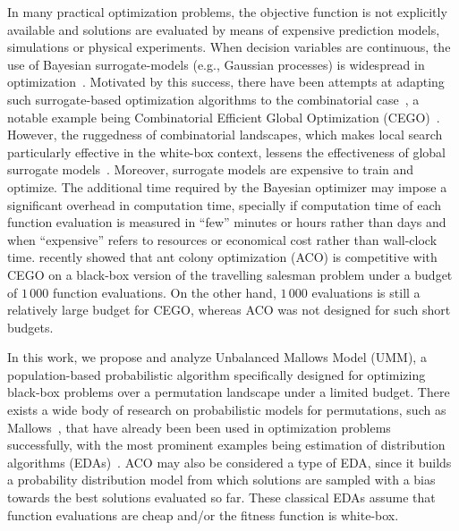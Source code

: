 \documentclass[runningheads]{llncs}
\begin{document}
In many practical optimization problems, the objective function is not
explicitly available and solutions are evaluated by means of expensive
prediction models, simulations or physical experiments. When decision variables
are continuous, the use of Bayesian surrogate-models (e.g., Gaussian processes)
is widespread in
optimization~\citep{JonSchWel98go,ForKea2009surrogate}. Motivated by this
success, there have been attempts at adapting such surrogate-based optimization
algorithms to the combinatorial case~\cite{MorKat2011:evo}, a notable example being Combinatorial
Efficient Global Optimization
(CEGO)~\citep{ZaeStoBar2014:ppsn,ZaeStoFriFisNauBar2014}. However, the
ruggedness of combinatorial landscapes, which makes local search particularly
effective in the white-box context, lessens the effectiveness of global
surrogate models~\citep{EriPeaGar2019scalable}. Moreover, surrogate models are
expensive to train and optimize. The additional time required by the Bayesian
optimizer may impose a significant overhead in computation time, specially if
computation time of each function evaluation is measured in ``few'' minutes or
hours rather than days and when ``expensive'' refers to resources or economical
cost rather than wall-clock time. \citet{PerLopStu2015si} recently showed that
ant colony optimization (ACO) %
is competitive with CEGO
on a black-box version of the travelling salesman problem under a budget of
$1\,000$ function evaluations.  On the other hand, $1\,000$ evaluations is
still a relatively large budget for CEGO, whereas ACO was not designed for such
short budgets.


In this work, we propose and analyze Unbalanced Mallows Model (UMM), a
population-based probabilistic algorithm specifically designed for optimizing
black-box problems over a permutation landscape under a limited budget. There
exists a wide body of research on probabilistic models for permutations, such
as Mallows~\cite{FliVer1986}, that have already been been used in optimization
problems successfully, with the most prominent examples being estimation of
distribution algorithms
(EDAs)~\cite{CebIruMen2014eda}. ACO may also be considered
a type of EDA, since it builds a probability distribution model from which
solutions are sampled with a bias towards the best solutions evaluated so
far. These classical EDAs  assume that function
evaluations are cheap and/or the fitness function is white-box.%
\end{document}
